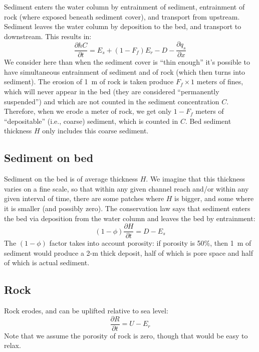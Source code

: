 \documentclass[12pt]{amsart}
\begin{document}
Sediment enters the water column by entrainment of sediment, entrainment of rock (where exposed beneath sediment cover), and transport from upstream. Sediment leaves the water column by deposition to the bed, and transport to downstream. This results in:
\begin{equation}
\frac{\partial h C}{\partial t} = E_s + (1-F_f) E_r - D - \frac{\partial q_s}{\partial x}
\label{dhCdt}
\end{equation}
We consider here than when the sediment cover is ``thin enough'' it's possible to have simultaneous entrainment of sediment and of rock (which then turns into sediment). The erosion of 1~m of rock is taken produce $F_f \times 1$ meters of fines, which will never appear in the bed (they are considered ``permanently suspended'') and which are not counted in the sediment concentration $C$. Therefore, when we erode a meter of rock, we get only $1-F_f$ meters of ``depositable'' (i.e., coarse) sediment, which is counted in $C$. Bed sediment thickness $H$ only includes this coarse sediment.

\subsection{Sediment on bed}

Sediment on the bed is of average thickness $H$. We imagine that this thickness varies on a fine scale, so that within any given channel reach and/or within any given interval of time, there are some patches where $H$ is bigger, and some where it is smaller (and possibly zero). The conservation law says that sediment enters the bed via deposition from the water column and leaves the bed by entrainment:
\begin{equation}
(1-\phi )\frac{\partial H}{\partial t} = D - E_s
\end{equation}
The $(1-\phi )$ factor takes into account porosity: if porosity is 50\%, then 1~m of sediment would produce a 2-m thick deposit, half of which is pore space and half of which is actual sediment.

\subsection{Rock}

Rock erodes, and can be uplifted relative to sea level:
\begin{equation}
\frac{\partial R}{\partial t} = U - E_r
\end{equation}
Note that we assume the porosity of rock is zero, though that would be easy to relax.
\end{document}
